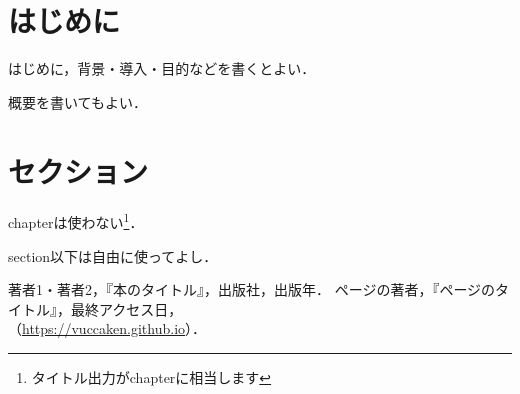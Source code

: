 \documentclass[uplatex,dvipdfmx]{vkaishi}
\begin{document}

\vcmaketitle %



\section*{はじめに}
はじめに，背景・導入・目的などを書くとよい．\par
概要を書いてもよい．


\section{セクション}
chapterは使わない\footnote{タイトル出力がchapterに相当します}．\par
section以下は自由に使ってよし．


\begin{thebibliography}{99}
   著者1・著者2，『本のタイトル』，出版社，出版年．
   ページの著者，『ページのタイトル』，最終アクセス日，\\（\url{https://vuccaken.github.io}）．
\end{thebibliography}
\end{document}
